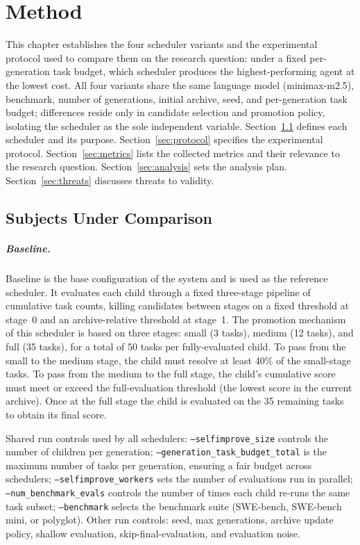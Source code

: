 \chapter{Method}
\label{chap:analysis-and-design}

This chapter establishes the four scheduler variants and the experimental
protocol used to compare them on the research question: under a fixed
per-generation task budget, which scheduler produces the
highest-performing agent at the lowest cost. All four variants share the
same language model (minimax-m2.5), benchmark, number of generations,
initial archive, seed, and per-generation task budget; differences reside
only in candidate selection and promotion policy, isolating the scheduler
as the sole independent variable. Section~\ref{sec:schedulers} defines
each scheduler and its purpose. Section~\ref{sec:protocol} specifies the
experimental protocol. Section~\ref{sec:metrics} lists the collected
metrics and their relevance to the research question.
Section~\ref{sec:analysis} sets the analysis plan.
Section~\ref{sec:threats} discusses threats to validity.

\section{Subjects Under Comparison}
\label{sec:schedulers}

\paragraph{Baseline.}
Baseline is the base configuration of the system and is used as the
reference scheduler. It evaluates each child through a fixed three-stage
pipeline of cumulative task counts, killing candidates between stages
on a fixed threshold at stage~0 and an archive-relative threshold at
stage~1. The promotion mechanism of this scheduler is based on three
stages: small (3 tasks), medium (12 tasks), and full (35 tasks), for a
total of 50 tasks per fully-evaluated child. To pass from the small to
the medium stage, the child must resolve at least 40\% of the
small-stage tasks. To pass from the medium to the full stage, the
child's cumulative score must meet or exceed the full-evaluation
threshold (the lowest score in the current archive). Once at the full
stage the child is evaluated on the 35 remaining tasks to obtain its
final score.

Shared run controls used by all schedulers:
\texttt{--selfimprove\_size} controls the number of children per
generation; \texttt{--generation\_task\_budget\_total} is the maximum
number of tasks per generation, ensuring a fair budget across schedulers;
\texttt{--selfimprove\_workers} sets the number of evaluations run in
parallel; \texttt{--num\_benchmark\_evals} controls the number of times
each child re-runs the same task subset; \texttt{--benchmark} selects the
benchmark suite (SWE-bench, SWE-bench mini, or polyglot). Other run
controls: seed, max generations, archive update policy, shallow
evaluation, skip-final-evaluation, and evaluation noise.

